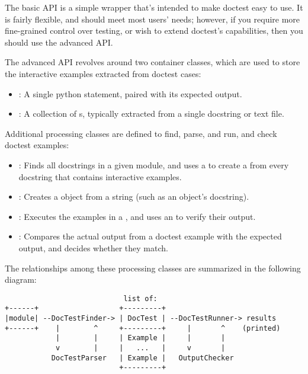 The basic API is a simple wrapper that's intended to make doctest easy
to use.  It is fairly flexible, and should meet most users' needs;
however, if you require more fine-grained control over testing, or
wish to extend doctest's capabilities, then you should use the
advanced API.

The advanced API revolves around two container classes, which are used
to store the interactive examples extracted from doctest cases:

\begin{itemize}
\item {}: A single python statement, paired with its
      expected output.
\item {}: A collection of s, typically
      extracted from a single docstring or text file.
\end{itemize}

Additional processing classes are defined to find, parse, and run, and
check doctest examples:

\begin{itemize}
\item {}: Finds all docstrings in a given module,
      and uses a  to create a 
      from every docstring that contains interactive examples.
\item {}: Creates a  object from
      a string (such as an object's docstring).
\item {}: Executes the examples in a
      , and uses an  to verify
      their output.
\item {}: Compares the actual output from a
      doctest example with the expected output, and decides whether
      they match.
\end{itemize}

The relationships among these processing classes are summarized in the
following diagram:

\begin{verbatim}
                            list of:
+------+                   +---------+
|module| --DocTestFinder-> | DocTest | --DocTestRunner-> results
+------+    |        ^     +---------+     |       ^    (printed)
            |        |     | Example |     |       |
            v        |     |   ...   |     v       |
           DocTestParser   | Example |   OutputChecker
                           +---------+
\end{verbatim}

